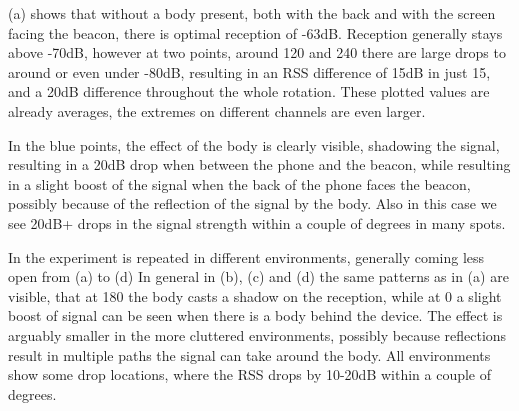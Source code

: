 (a) shows that without a body present, both with the back and with the screen facing the beacon, there is optimal reception of -63dB.
Reception generally stays above -70dB, however at two points, around 120\textdegree{} and 240\textdegree{} there are large drops to around or even under -80dB, resulting in an RSS difference of 15dB in just 15\textdegree{}, and a 20dB difference throughout the whole rotation.
These plotted values are already averages, the extremes on different channels are even larger.

In the blue points, the effect of the body is clearly visible, shadowing the signal, resulting in a 20dB drop when between the phone and the beacon, while resulting in a slight boost of the signal when the back of the phone faces the beacon, possibly because of the reflection of the signal by the body.
Also in this case we see 20dB+ drops in the signal strength within a couple of degrees in many spots.

In  the experiment is repeated in different environments, generally coming less open from (a) to (d)
In general in (b), (c) and (d) the same patterns as in (a) are visible, that at 180\textdegree{} the body casts a shadow on the reception, while at 0\textdegree{} a slight boost of signal can be seen when there is a body behind the device.
The effect is arguably smaller in the more cluttered environments, possibly because reflections result in multiple paths the signal can take around the body.
All environments show some drop locations, where the RSS drops by 10-20dB within a couple of degrees.

